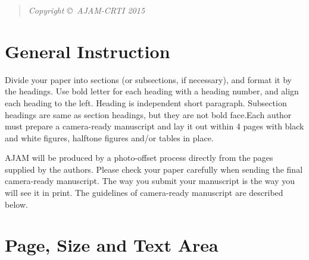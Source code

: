 \documentclass[times,twoside,5p]{ajam}
\begin{document}
\begin{frontmatter}
\begin{abstract}
\begin{center}
{{{\textit{Copyright \copyright\ AJAM-CRTI 2015}}
} }
\end{center}
\end{abstract}


\end{frontmatter}


\section{General Instruction}
\label{S:1}Divide your paper into sections (or subsections, if necessary), and format it by the headings. Use bold letter for each heading with a heading number, and align each heading to the left. Heading is independent short paragraph. Subsection headings are same as section headings, but they are not bold face.Each author must prepare a camera-ready manuscript and lay it out within 4 pages with black and white figures, halftone figures and/or tables in place. 

AJAM will be produced by a photo-offset process directly from the pages supplied by the authors. Please check your paper carefully when sending the final camera-ready manuscript. The way you submit your manuscript is the way you will see it in print. The guidelines of camera-ready manuscript are described below.

\section{Page, Size and Text Area}
\end{document}
